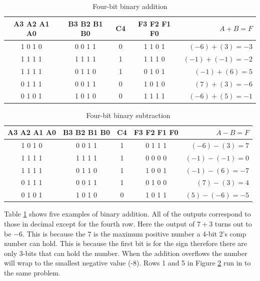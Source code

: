 \documentclass[CMPE]{KGCOEReport}
\begin{document}
\begin{table}[h]
\renewcommand{\arraystretch}{1.2}
\setlength{\tabcolsep}{12pt}
\caption{Four-bit binary addition}
\begin{center}
\begin{tabular}{|c|c||c|c||r|}
\hline
A3 A2 A1 A0 & B3 B2 B1 B0 & C4 & F3 F2 F1 F0 & $A + B = F$\\\hline
1 0 1 0 & 0 0 1 1 & 0 & 1 1 0 1 & $(-6) + (3) = -3$\\\hline
1 1 1 1 & 1 1 1 1 & 1 & 1 1 1 0 & $(-1) + (-1) = -2$\\\hline
1 1 1 1 & 0 1 1 0 & 1 & 0 1 0 1 & $(-1) + (6) = 5$\\\hline
0 1 1 1 & 0 0 1 1 & 0 & 1 0 1 0 & $(7) + (3) = -6$\\\hline
0 1 0 1 & 1 0 1 0 & 0 & 1 1 1 1 & $(-6) + (5) = -1$\\\hline
\end{tabular}
\end{center}
\label{tab:add}
\end{table}

\begin{table}[h!]
\renewcommand{\arraystretch}{1.2}
\setlength{\tabcolsep}{12pt}
\caption{Four-bit binary subtraction}
\begin{center}
\begin{tabular}{|c|c||c|c||r|}
\hline
A3 A2 A1 A0 & B3 B2 B1 B0 & C4 & F3 F2 F1 F0 & $A - B = F$\\\hline
1 0 1 0 & 0 0 1 1 & 1 & 0 1 1 1 & $(-6) - (3) = 7$\\\hline
1 1 1 1 & 1 1 1 1 & 1 & 0 0 0 0 & $(-1) - (-1) = 0$\\\hline
1 1 1 1 & 0 1 1 0 & 1 & 1 0 0 1 & $(-1) - (6) = -7$\\\hline
0 1 1 1 & 0 0 1 1 & 1 & 0 1 0 0 & $(7) - (3) = 4$\\\hline
0 1 0 1 & 1 0 1 0 & 0 & 1 0 1 1 & $(5) - (-6) = -5$\\\hline
\end{tabular}
\end{center}
\label{tab:sub}
\end{table}

Table \ref{tab:add} shows five examples of binary addition. All of the outputs correspond to those in decimal except for the fourth row. Here the output of $7 + 3$ turns out to be $-6$. This is because the $7$ is the maximum positive number a 4-bit 2's comp number can hold. This is because the first bit is for the sign therefore there are only 3-bits that can hold the number. When the addition overflows the number will wrap to the smallest negative value (-8). Rows 1 and 5 in Figure \ref{tab:sub} run in to the same problem.
\end{document}
